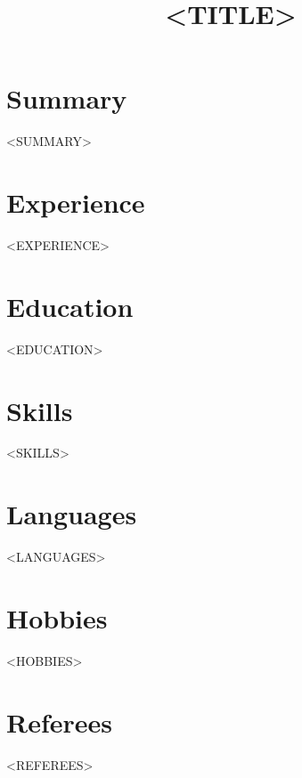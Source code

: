 \documentclass[11pt,a4paper,sans]{moderncv}
\title{<TITLE>}
\begin{document}
\makecvtitle

\section{Summary}
<SUMMARY>

\section{Experience}
<EXPERIENCE>

\section{Education}
<EDUCATION>

\section{Skills}
<SKILLS>

\section{Languages}
<LANGUAGES>

\section{Hobbies}
<HOBBIES>

\section{Referees}
<REFEREES>
\end{document}
